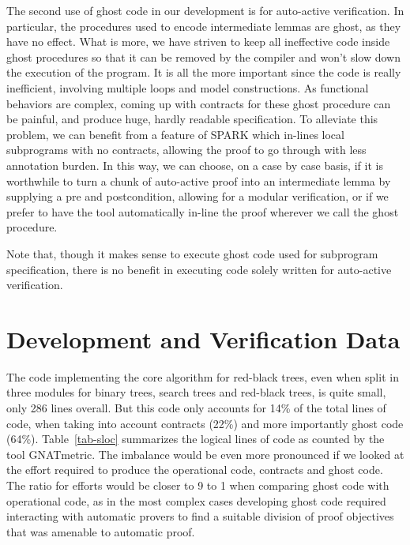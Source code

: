 \documentclass[11pt,a4paper]{article}
\begin{document}
The second use of ghost code in our development is for auto-active verification. In particular, the procedures
used to encode intermediate lemmas are ghost, as they have no effect. What is more, we have striven to
keep all ineffective code inside ghost procedures so that it can be removed by the compiler and won't
slow down the execution of the program. It is all the more important since the code is really inefficient, involving
multiple loops and model constructions. As functional behaviors are complex, coming up with contracts for
these ghost procedure can be painful, and produce huge, hardly readable specification. To alleviate this
problem, we can benefit from a feature of SPARK which in-lines local subprograms with no contracts, allowing
the proof to go through with less annotation burden. In this way, we can choose, on a case by case basis, if
it is worthwhile to turn a chunk of auto-active proof into an intermediate lemma by supplying a pre and
postcondition, allowing for a modular verification, or if we prefer to have the tool automatically in-line the
proof wherever we call the ghost procedure.

Note that, though it makes sense to execute ghost code used for subprogram specification, there is no benefit in
executing code solely written for auto-active verification.

\section{Development and Verification Data}

The code implementing the core algorithm for red-black trees, even when split
in three modules for binary trees, search trees and red-black trees, is quite
small, only 286 lines overall. But this code only accounts for 14\% of the
total lines of code, when taking into account contracts (22\%) and more
importantly ghost code (64\%). Table~\ref{tab-sloc} summarizes the logical
lines of code as counted by the tool GNATmetric. The imbalance would be even
more pronounced if we looked at the effort required to produce the operational
code, contracts and ghost code. The ratio for efforts would be closer to 9 to 1
when comparing ghost code with operational code, as in the most complex cases
developing ghost code required interacting with automatic provers to find a
suitable division of proof objectives that was amenable to automatic proof.
\end{document}
